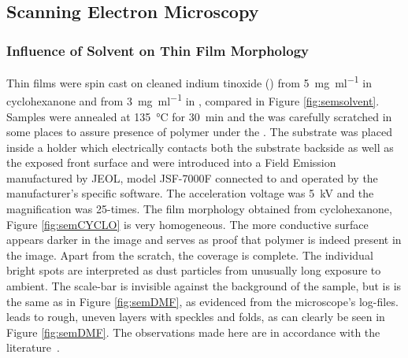 \subsection{Scanning Electron Microscopy}
\subsubsection{Influence of Solvent on Thin Film Morphology}
Thin films were spin cast on cleaned indium tinoxide (\ito{}) from \SI{5}{\milli\gram\per\milli\litre} \pvdf{} in cyclohexanone and from \SI{3}{\milli\gram\per\milli\litre} \pvdf{} in \dmf{}, compared in Figure \ref{fig:semsolvent}. Samples were annealed at \SI{135}{\degreeCelsius} for \SI{30}{\minute} and the \pvdf{} was carefully scratched in some places to assure presence of polymer under the \sem{}. The substrate was placed inside a holder which electrically contacts both the substrate backside as well as the exposed \pvdf{} front surface and were introduced into a Field Emission \sem{} manufactured by JEOL, model JSF-7000F connected to and operated by the manufacturer's specific software. The acceleration voltage was \SI{5}{\kilo\volt} and the magnification was 25-times. The film morphology obtained from cyclohexanone, Figure \ref{fig:semCYCLO} is very homogeneous. The more conductive \ito{} surface appears darker in the image and serves as proof that polymer is indeed present in the image. Apart from the scratch, the coverage is complete. The individual bright spots are interpreted as dust particles from unusually long exposure to ambient. The scale-bar is invisible against the background of the sample, but is is the same as in Figure \ref{fig:semDMF}, as evidenced from the microscope's log-files. \dmf{} leads to rough, uneven \pvdf{} layers with speckles and folds, as can clearly be seen in Figure \ref{fig:semDMF}. The observations made here are in accordance with the literature~\cite{naber_cyclo}.
